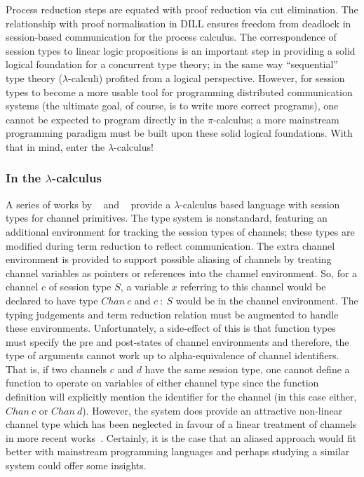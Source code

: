 Process reduction steps are equated with proof reduction via cut
elimination. The relationship with proof normalisation in DILL ensures
freedom from deadlock in session-based communication for the process
calculus. The correspondence of session types to linear logic propositions is
an important step in providing a solid logical foundation for a concurrent
type theory; in the same way ``sequential'' type theory ($\lambda$-calculi)
profited from a logical perspective. However, for session types to become a
more usable tool for programming distributed communication systems (the
ultimate goal, of course, is to write more correct programs), one cannot be
expected to program directly in the $\pi$-calculus; a more mainstream
programming paradigm must be built upon these solid logical foundations. With
that in mind, enter the $\lambda$-calculus!

\subsubsection{In the \texorpdfstring{$\lambda$}{lambda}-calculus}
\label{sec:lam}

A series of works by \citeauthor{Gay:2003:STI}~\cite{Gay:2003:STI} and
\citeauthor{Vasconcelos:2006:TCM}~\cite{Vasconcelos:2006:TCM} provide a
$\lambda$-calculus based language with session types for channel
primitives. The type system is nonstandard, featuring an additional
environment for tracking the session types of channels; these types are
modified during term reduction to reflect communication. The extra channel
environment is provided to support possible aliasing of channels by treating
channel variables as pointers or references into the channel environment. So,
for a channel $c$ of session type $S$, a variable $x$ referring to this
channel would be declared to have type $Chan~c$ and $c~:~S$ would be in the
channel environment. The typing judgements and term reduction relation must be
augmented to handle these environments. Unfortunately, a side-effect of this
is that function types must specify the pre and post-states of channel
environments and therefore, the type of arguments cannot work up to
alpha-equivalence of channel identifiers. That is, if two channels $c$ and $d$
have the same session type, one cannot define a function to operate on
variables of either channel type since the function definition will explicitly
mention the identifier for the channel (in this case either, $Chan~c$ or
$Chan~d$). However, the system does provide an attractive non-linear channel
type which has been neglected in favour of a linear treatment of channels in
more recent
works~\cite{Gay:2010:LAST,Mazurak:2010:LCC,Wadler:2014}. Certainly, it is the
case that an aliased approach would fit better with mainstream programming
languages and perhaps studying a similar system could offer some insights.

